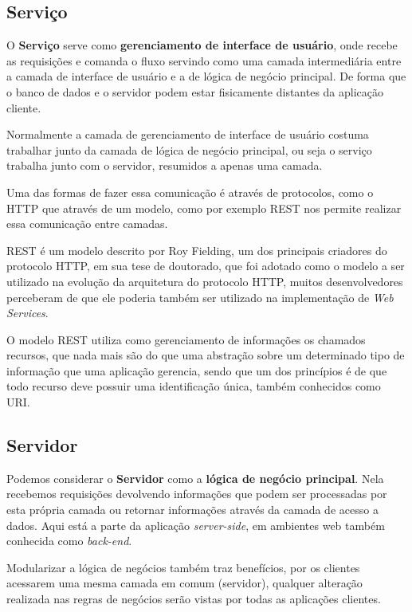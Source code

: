 \documentclass[
	12pt,				%
	openright,			%
	twoside,			%
	a4paper,			%
	english,			%
	brazil				%
	]{abntex2}
\begin{document}
\subsection{Serviço}
\label{subsec:Servico}

O \textbf{Serviço} serve como \textbf{gerenciamento de interface de usuário}, onde recebe as requisições e comanda o fluxo servindo como uma camada intermediária entre a camada de interface de usuário e a de lógica de negócio principal. De forma que o banco de dados e o servidor podem estar fisicamente distantes da aplicação cliente.

Normalmente a camada de gerenciamento de interface de usuário costuma trabalhar junto da camada de lógica de negócio principal, ou seja o serviço trabalha junto com o servidor, resumidos a apenas uma camada.

Uma das formas de fazer essa comunicação é através de protocolos, como o HTTP que através de um modelo, como por exemplo REST nos permite realizar essa comunicação entre camadas.

REST é um modelo descrito por Roy Fielding, um dos principais criadores do protocolo HTTP, em sua tese de doutorado, que foi adotado como o modelo a ser utilizado na evolução da arquitetura do protocolo HTTP, muitos desenvolvedores perceberam de que ele poderia também ser utilizado na implementação de \textit{Web Services}.

O modelo REST utiliza como gerenciamento de informações os chamados recursos, que nada mais são do que uma abstração sobre um determinado tipo de informação que uma aplicação gerencia, sendo que um dos princípios é de que todo recurso deve possuir uma identificação única, também conhecidos como URI.

\subsection{Servidor}
\label{subsec:Servidor}

Podemos considerar o \textbf{Servidor} como a \textbf{lógica de negócio principal}. Nela recebemos requisições devolvendo informações que podem ser processadas por esta própria camada ou retornar informações através da camada de acesso a dados. Aqui está a parte da aplicação \textit{server-side}, em ambientes web também conhecida como \textit{back-end}.

Modularizar a lógica de negócios também traz benefícios, por os clientes acessarem uma mesma camada em comum (servidor), qualquer alteração realizada nas regras de negócios serão vistas por todas as aplicações clientes.
\end{document}
